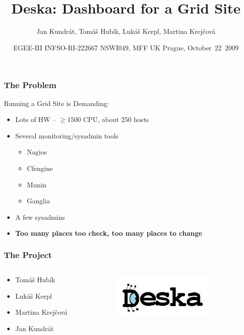 \documentclass{beamer}
\begin{document}
\title{Deska: Dashboard for a Grid Site}
\author{Jan Kundrát, Tomáš Hubík, Lukáš Kerpl, Martina Krejčová}
\date{
   {EGEE-III INFSO-RI-222667}  
\hfill
NSWI049, MFF UK Prague, October~22~2009
}
\begin{frame}
\maketitle
\end{frame}


\begin{frame}
\frametitle{The Problem}

Running a Grid Site is Demanding:

\begin{itemize}
    \item Lots of HW -- $\ge 1500$ CPU, about 250 hosts
    \item Several monitoring/sysadmin tools
        \begin{itemize}
            \item Nagios
            \item Cfengine
            \item Munin
            \item Ganglia
        \end{itemize}
    \item A few sysadmins
    \item \bf{Too many places too check, too many places to change}
\end{itemize}
\end{frame}

\begin{frame}
\frametitle{The Project}

\begin{columns}
\begin{column}[l]{5cm}
\begin{itemize}
    \item Tomáš Hubík
    \item Lukáš Kerpl
    \item Martina Krejčová
    \item Jan Kundrát
\end{itemize}
\end{column}
\begin{column}[r]{5cm}
\includegraphics[width=5cm]{../../../../logo.jpg}
\end{column}
\end{columns}

\end{frame}
\end{document}
